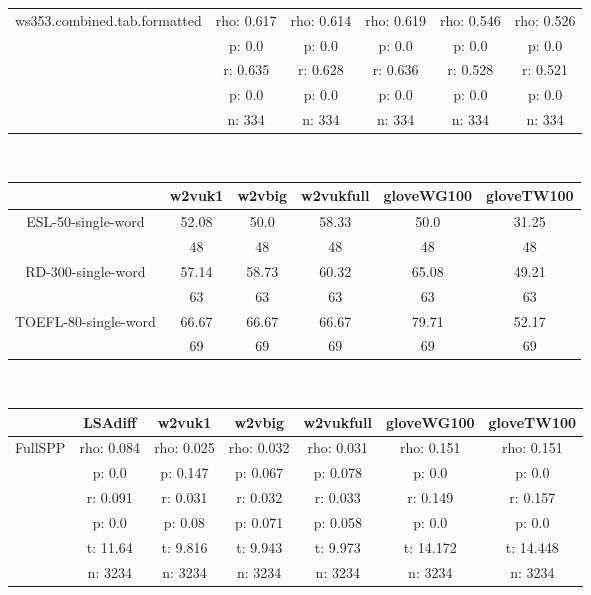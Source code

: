 \documentclass{article}
\begin{document}
\begin{tabular}{cccccc|}
\hline
\multicolumn{1}{|c|}{\multirow{5}{*}{ws353.combined.tab.formatted}} & rho: 0.617 & rho: 0.614 & rho: 0.619 & rho: 0.546 & rho: 0.526 \\
\multicolumn{1}{|c|}{} & p: 0.0 & p: 0.0 & p: 0.0 & p: 0.0 & p: 0.0 \\
\multicolumn{1}{|c|}{} & r: 0.635 & r: 0.628 & r: 0.636 & r: 0.528 & r: 0.521 \\
\multicolumn{1}{|c|}{} & p: 0.0 & p: 0.0 & p: 0.0 & p: 0.0 & p: 0.0 \\
\multicolumn{1}{|c|}{} & n: 334 & n: 334 & n: 334 & n: 334 & n: 334 \\
\hline
\end{tabular}\\
\begin{tabular}{cccccc|}\cline{2-6}
&\multicolumn{1}{|c}{w2vuk1} & w2vbig & w2vukfull & gloveWG100 & gloveTW100 \\\hline
\multicolumn{1}{|c|}{\multirow{2}{*}{ESL-50-single-word}} & 52.08 & 50.0 & 58.33 & 50.0 & 31.25 \\
\multicolumn{1}{|c|}{} & 48 & 48 & 48 & 48 & 48 \\
\hline
\multicolumn{1}{|c|}{\multirow{2}{*}{RD-300-single-word}} & 57.14 & 58.73 & 60.32 & 65.08 & 49.21 \\
\multicolumn{1}{|c|}{} & 63 & 63 & 63 & 63 & 63 \\
\hline
\multicolumn{1}{|c|}{\multirow{2}{*}{TOEFL-80-single-word}} & 66.67 & 66.67 & 66.67 & 79.71 & 52.17 \\
\multicolumn{1}{|c|}{} & 69 & 69 & 69 & 69 & 69 \\
\hline
\end{tabular}\\
\begin{tabular}{ccccccc|}\cline{2-7}
&\multicolumn{1}{|c}{LSAdiff} & w2vuk1 & w2vbig & w2vukfull & gloveWG100 & gloveTW100 \\\hline
\multicolumn{1}{|c|}{\multirow{6}{*}{FullSPP}} & rho: 0.084 & rho: 0.025 & rho: 0.032 & rho: 0.031 & rho: 0.151 & rho: 0.151 \\
\multicolumn{1}{|c|}{} & p: 0.0 & p: 0.147 & p: 0.067 & p: 0.078 & p: 0.0 & p: 0.0 \\
\multicolumn{1}{|c|}{} & r: 0.091 & r: 0.031 & r: 0.032 & r: 0.033 & r: 0.149 & r: 0.157 \\
\multicolumn{1}{|c|}{} & p: 0.0 & p: 0.08 & p: 0.071 & p: 0.058 & p: 0.0 & p: 0.0 \\
\multicolumn{1}{|c|}{} & t: 11.64 & t: 9.816 & t: 9.943 & t: 9.973 & t: 14.172 & t: 14.448 \\
\multicolumn{1}{|c|}{} & n: 3234 & n: 3234 & n: 3234 & n: 3234 & n: 3234 & n: 3234 \\
\hline
\end{tabular}\\
\end{document}
